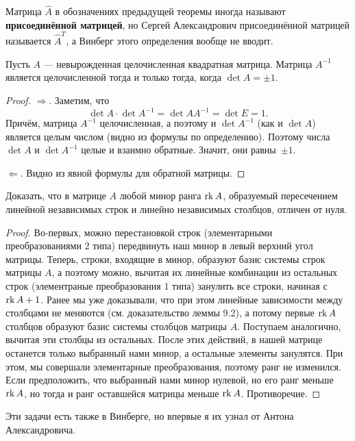 \begin{remark}
    Матрица $\widehat{A}$ в обозначениях предыдущей теоремы иногда называют \textbf{присоединённой матрицей}, но Сергей Александрович присоединённой матрицей называется $\widehat{A}^T$, а Винберг этого определения вообще не вводит.
\end{remark}

\begin{statement}
    Пусть $A$ --- невырожденная целочисленная квадратная матрица. Матрица $A^{-1}$ является целочисленной тогда и только тогда, когда $\det A = \pm 1$.
\end{statement}

\begin{proof}
    $\Rightarrow$. Заметим, что
    $$
    \det A \cdot \det A^{-1} = \det AA^{-1} = \det E = 1.
    $$
    Причём, матрица $A^{-1}$ целочисленная, а поэтому и $\det A^{-1}$ (как и $\det A$) является целым числом (видно из формулы по определению). Поэтому числа $\det A$ и $\det A^{-1}$ целые и взаимно обратные. Значит, они \mbox{равны $\pm 1$}.

    $\Leftarrow$. Видно из явной формулы для обратной матрицы.
\end{proof}

\begin{statement}
    Доказать, что в матрице $A$ любой минор ранга $\mathrm{rk}\, A$, образуемый пересечением линейной независимых строк и линейно независимых столбцов, отличен от нуля.
\end{statement}

\begin{proof}
    Во-первых, можно перестановкой строк (элементарными преобразованиями 2 типа) передвинуть наш минор в левый верхний угол матрицы. Теперь, строки, входящие в минор, образуют базис системы строк матрицы $A$, а поэтому можно, вычитая их линейные комбинации из остальных строк (элементраные преобразования 1 типа) занулить все строки, начиная с $\mathrm{rk}\, A + 1$. Ранее мы уже доказывали, что при этом линейные зависимости между столбцами не меняются (см. доказательство леммы 9.2), а потому первые $\mathrm{rk}\, A$ столбцов образуют базис системы столбцов матрицы $A$. Поступаем аналогично, вычитая эти столбцы из остальных. После этих действий, в нашей матрице останется только выбранный нами минор, а остальные элементы занулятся. При этом, мы совершали элементарные преобразования, поэтому ранг не изменился. Если предположить, что выбранный нами минор нулевой, но его ранг меньше $\mathrm{rk}\, A$, но тогда и ранг оставшейся матрицы меньше $\mathrm{rk}\, A$. Противоречие.
\end{proof}

\begin{remark}
    Эти задачи есть также в Винберге, но впервые я их узнал от Антона Александровича.
\end{remark}

